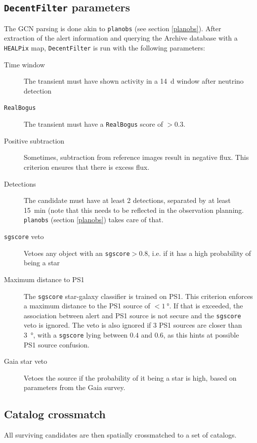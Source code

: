 \documentclass[
    a4paper, %
    fontsize=10pt, %
    twoside=true, %
    numbers=noenddot, %
    fontmethod=tex,
]{kaobook}
\begin{document}
\subsection{\texttt{DecentFilter} parameters}
The GCN parsing is done akin to \texttt{planobs} (see section \ref{planobs}). After extraction of the alert information and querying the Archive database with a \texttt{HEALPix} map, \texttt{DecentFilter} is run with the following parameters:
\begin{description}
    \item[Time window] The transient must have shown activity in a \SI{14}{\day} window after neutrino detection
    \item[\texttt{RealBogus}] The transient must have a \texttt{RealBogus} score of $>0.3$.
    \item[Positive subtraction] Sometimes, subtraction from reference images result in negative flux. This criterion ensures that there is excess flux.
    \item[Detections] The candidate must have at least 2 detections, separated by at least \SI{15}{\minute} (note that this needs to be reflected in the observation planning. \texttt{planobs} (section \ref{planobs}) takes care of that.
    \item[\texttt{sgscore} veto] Vetoes any object with an \texttt{sgscore}$>0.8$, i.e. if it has a high probability of being a star
    \item[Maximum distance to PS1] The \texttt{sgscore} star-galaxy classifier is trained on PS1. This criterion enforces a maximum distance to the PS1 source of $<\SI{1}{\degree}$. If that is exceeded, the association between alert and PS1 source is not secure and the \texttt{sgscore} veto is ignored. The veto is also ignored if 3 PS1 sources are closer than \SI{3}{\degree}, with a \texttt{sgscore} lying between $0.4$ and $0.6$, as this hints at possible PS1 source confusion.
    \item[Gaia star veto] Vetoes the source if the probability of it being a star is high, based on parameters from the Gaia survey.
\end{description}

\subsection{Catalog crossmatch}
All surviving candidates are then spatially crossmatched to a set of catalogs.



\end{document}
